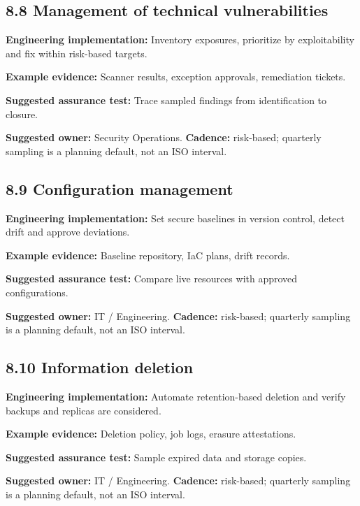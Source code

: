 \documentclass[11pt,letterpaper]{article}
\begin{document}
\subsection{8.8 Management of technical vulnerabilities}
\textbf{Engineering implementation:} Inventory exposures, prioritize by exploitability and fix within risk-based targets.\par
\textbf{Example evidence:} Scanner results, exception approvals, remediation tickets.\par
\textbf{Suggested assurance test:} Trace sampled findings from identification to closure.\par
\textbf{Suggested owner:} Security Operations. \textbf{Cadence:} risk-based; quarterly sampling is a planning default, not an ISO interval.\par
{}
\subsection{8.9 Configuration management}
\textbf{Engineering implementation:} Set secure baselines in version control, detect drift and approve deviations.\par
\textbf{Example evidence:} Baseline repository, IaC plans, drift records.\par
\textbf{Suggested assurance test:} Compare live resources with approved configurations.\par
\textbf{Suggested owner:} IT / Engineering. \textbf{Cadence:} risk-based; quarterly sampling is a planning default, not an ISO interval.\par
{}
\subsection{8.10 Information deletion}
\textbf{Engineering implementation:} Automate retention-based deletion and verify backups and replicas are considered.\par
\textbf{Example evidence:} Deletion policy, job logs, erasure attestations.\par
\textbf{Suggested assurance test:} Sample expired data and storage copies.\par
\textbf{Suggested owner:} IT / Engineering. \textbf{Cadence:} risk-based; quarterly sampling is a planning default, not an ISO interval.\par
{}
\end{document}
